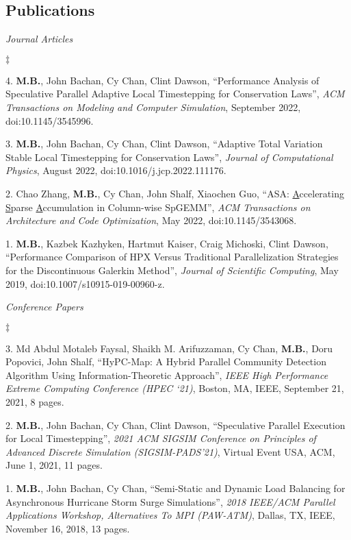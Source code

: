 \documentclass[margin,line]{res}
\newenvironment{list2}{
  \begin{list}{$\ddagger$}{%
      \setlength{\itemsep}{0in}
      \setlength{\parsep}{0in} \setlength{\parskip}{0in}
      \setlength{\topsep}{0in} \setlength{\partopsep}{0in}
      \setlength{\leftmargin}{0.2in}}}{\end{list}}
\newcommand{\article}[5]{%
#1, ``#2'', {\it #3}, #4, #5.%
}
\newcommand{\inproceeding}[7]{%
#1, ``#2'', {\it #3}, #4, #5, #6, #7 pages.%
}
\begin{document}
\begin{resume}
\section{\sc Publications}
\textit{Journal Articles}
\vspace{0.05in}
\begin{list2}
\item[4.] \article{{\bf M.B.}, John Bachan, Cy Chan, Clint Dawson}{Performance Analysis of Speculative Parallel Adaptive Local Timestepping for Conservation Laws}{ACM Transactions on Modeling and Computer Simulation}{September 2022}{doi:10.1145/3545996}
\item[3.] \article{{\bf M.B.}, John Bachan, Cy Chan, Clint Dawson}{Adaptive Total Variation Stable Local Timestepping for Conservation Laws}{Journal of Computational Physics}{August 2022}{\newline doi:10.1016/j.jcp.2022.111176}
\item[2.] \article{Chao Zhang, {\bf M.B.}, Cy Chan, John Shalf, Xiaochen Guo}{ASA: \underline{A}ccelerating \underline{S}parse \underline{A}ccumulation in Column-wise SpGEMM}{ACM Transactions on Architecture and Code Optimization}{May 2022}{doi:10.1145/3543068}
\item[1.] \article{{\bf M.B.}, Kazbek Kazhyken, Hartmut Kaiser, Craig Michoski, Clint Dawson}{Performance Comparison of HPX Versus Traditional Parallelization Strategies for the Discontinuous Galerkin Method}{Journal of Scientific Computing}{May 2019}{doi:10.1007/s10915-019-00960-z}
\end{list2}
\textit{Conference Papers}
\vspace{0.05in}
\begin{list2}
\item[3.] \inproceeding{Md Abdul Motaleb Faysal, Shaikh M. Arifuzzaman, Cy Chan, {\bf M.B.}, Doru Popovici, John Shalf}{{HyPC-Map}: {A} Hybrid Parallel Community Detection Algorithm Using Information-Theoretic Approach}{IEEE High Performance Extreme Computing Conference (HPEC ‘21)}{Boston, MA}{IEEE}{September 21, 2021}{8}
\item[2.] \inproceeding{{\bf M.B.}, John Bachan, Cy Chan, Clint Dawson}{Speculative Parallel Execution for Local Timestepping}{2021 ACM SIGSIM Conference on Principles of Advanced Discrete Simulation (SIGSIM-PADS'21)}{Virtual Event USA}{ACM}{June 1, 2021}{11}
\item[1.] \inproceeding{{\bf M.B.}, John Bachan, Cy Chan}{Semi-Static and Dynamic Load Balancing for Asynchronous Hurricane Storm Surge Simulations}{2018 IEEE/ACM Parallel Applications Workshop, Alternatives To MPI (PAW-ATM)}{Dallas, TX}{IEEE}{November 16, 2018}{13}
\end{list2}


\end{resume}
\end{document}
